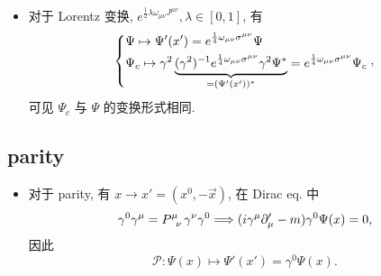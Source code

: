 \begin{itemize}
	\item 对于 Lorentz 变换, $e^{\frac{1}{2} \lambda \omega_{\mu \nu} J^{\mu \nu}}, \lambda \in [0, 1]$, 有
	\begin{equation}
		\begin{dcases}
			\Psi \mapsto \Psi'(x') = e^{\frac{1}{4} \omega_{\mu \nu} \sigma^{\mu \nu}} \Psi \\
			\Psi_c \mapsto \gamma^2 \underbrace{(\gamma^2)^{- 1}  e^{\frac{1}{4} \omega_{\mu \nu} \sigma^{\mu \nu}} \gamma^2 \Psi^*}_{= (\Psi'(x'))^*} = e^{\frac{1}{4} \omega_{\mu \nu} \sigma^{\mu \nu}} \Psi_c
		\end{dcases},
	\end{equation}
	可见 $\Psi_c$ 与 $\Psi$ 的变换形式相同.
\end{itemize}

\subsection{parity}
\begin{itemize}
	\item 对于 parity, 有 $x \rightarrow x' = (x^0, - \vec{x})$, 在 Dirac eq. 中
	\begin{equation}
		\gamma^0 \gamma^\mu = \tensor{P}{^\mu_\nu} \gamma^\nu \gamma^0 \Longrightarrow (i \gamma^\mu \partial'_\mu - m) \gamma^0 \Psi(x) = 0,
	\end{equation}
	因此
	\begin{equation}
		\mathcal{P} : \Psi(x) \mapsto \Psi'(x') = \gamma^0 \Psi(x).
	\end{equation}
\end{itemize}

